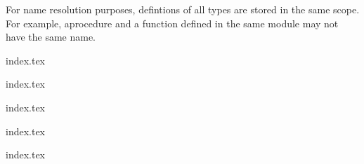 For name resolution purposes, defintions of all types are stored in the same
scope. For example, aprocedure and a function defined in the same module may
not have the same name.

{index.tex}

{index.tex}

{index.tex}

{index.tex}

{index.tex}
